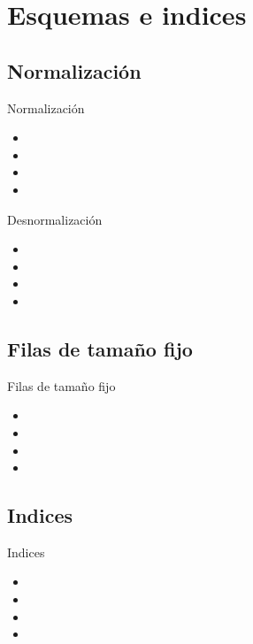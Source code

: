 \section{Esquemas e indices}

\subsection{Normalización}
\begin{frame}{Normalización}
  \begin{itemize}
    \item 
    \item 
    \item 
    \item 
  \end{itemize}
\end{frame}

\begin{frame}{Desnormalización}
  \begin{itemize}
    \item 
    \item 
    \item 
    \item 
  \end{itemize}
\end{frame}

\subsection{Filas de tamaño fijo}
\begin{frame}{Filas de tamaño fijo}
  \begin{itemize}
    \item 
    \item 
    \item 
    \item 
  \end{itemize}
\end{frame}

\subsection{Indices}
\begin{frame}{Indices}
  \begin{itemize}
    \item 
    \item 
    \item 
    \item 
  \end{itemize}
\end{frame}
